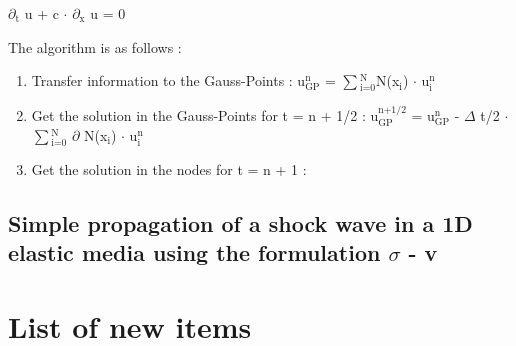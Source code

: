 \documentclass[11pt]{article}
\begin{document}
$\partial$$_{\text{t}}$ u + c $\cdot$ $\partial$$_{\text{x}}$ u = 0

The algorithm is as follows : 
\begin{enumerate}
\item Transfer information to the Gauss-Points :  u$^{\text{n}}_{\text{GP}}$ = $\sum$$^{\text{N}}_{\text{i=0}}$N(x$_{\text{i}}$) $\cdot$ u$^{\text{n}}_{\text{i}}$
\item Get the solution in the Gauss-Points for t = n + 1/2 : u$^{\text{n+1/2}}_{\text{GP}}$ = u$^{\text{n}}_{\text{GP}}$ - $\Delta$ t/2 $\cdot$ $\sum$$^{\text{N}}_{\text{i=0}}$ $\partial$ N(x$_{\text{i}}$) $\cdot$ u$^{\text{n}}_{\text{i}}$
\item Get the solution in the nodes for t = n + 1 :
\end{enumerate}

\subsection{Simple propagation of a shock wave in a 1D elastic media using the formulation $\sigma$ - v}
\label{sec-3-2}

\section{List of new items}
\label{sec-4}
\end{document}
